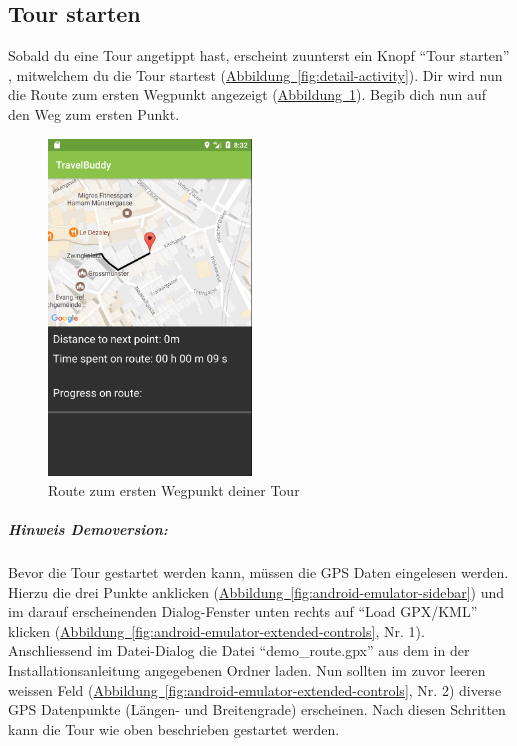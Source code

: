 \documentclass[a4paper,10pt,xetex]{article}
\begin{document}
\subsection{Tour starten}

Sobald du eine Tour angetippt hast, erscheint zuunterst ein Knopf ``Tour starten''
, mitwelchem du die Tour startest (\hyperref[fig:detail-activity]{Abbildung~\ref*{fig:detail-activity}}).
Dir wird nun die Route zum ersten Wegpunkt angezeigt (\hyperref[fig:tour-activity]{Abbildung~\ref*{fig:tour-activity}}).
Begib dich nun auf den Weg zum ersten Punkt.

\begin{figure}
  \centering
  \includegraphics[width=0.48\textwidth]{screenshots/TourActivityStart}
  \caption{Route zum ersten Wegpunkt deiner Tour}
  \label{fig:tour-activity}
\end{figure}

\subparagraph{Hinweis Demoversion:}
Bevor die Tour gestartet werden kann, müssen die GPS Daten eingelesen werden. Hierzu
die drei Punkte anklicken (\hyperref[fig:android-emulator-sidebar]{Abbildung~\ref*{fig:android-emulator-sidebar}})
und im darauf erscheinenden Dialog-Fenster unten rechts auf ``Load GPX/KML'' klicken
(\hyperref[fig:android-emulator-extended-controls]{Abbildung~\ref*{fig:android-emulator-extended-controls}}, Nr. 1).
Anschliessend im Datei-Dialog die Datei ``demo\_route.gpx'' aus dem in der
Installationsanleitung angegebenen Ordner laden. Nun sollten im zuvor leeren
weissen Feld (\hyperref[fig:android-emulator-extended-controls]{Abbildung~\ref*{fig:android-emulator-extended-controls}}, Nr. 2)
diverse GPS Datenpunkte (Längen- und Breitengrade) erscheinen. Nach diesen
Schritten kann die Tour wie oben beschrieben gestartet werden.
\end{document}
